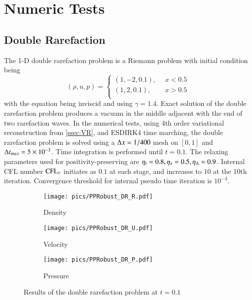 \documentclass[preprint,12pt]{elsarticle}
\begin{document}
\section{Numeric Tests}

\subsection{Double Rarefaction}

The 1-D double rarefaction problem \cite{hu2004kineticDoubleRare} 
is a Riemann problem with initial condition being
\begin{equation}
    (\rho,u,p) = \left\{
        \begin{array}{ll}
            (1,-2,0.1),\ \ & x < 0.5\\
            (1,2,0.1),\ \ & x > 0.5\\
        \end{array}
    \right.
\end{equation}
with the equation being inviscid and using $\gamma=1.4$.
Exact solution of the double rarefaction problem produces a vacuum 
in the middle adjacent with the end of two rarefaction waves.
In the numerical tests, using 4th order variational reconstruction from \ref{ssec:VR},
and ESDIRK4 time marching, 
the double rarefaction problem is solved using a $\mathrm\Delta x = 1/400$ mesh 
on $[0,1]$ and $\mathrm\Delta t_{max} = 5\times 10^{-3}$. 
Time integration is performed until $t=0.1$.
 The relaxing parameters used 
for positivity-preserving are $\eta_t= 0.8, \eta_\tau=0.5, \eta_\mathrm\Delta=0.9$.
Internal CFL number $\text{CFL}_\tau$ initiates as $0.1$ at each stage, and 
increases to $10$ at the 10th iteration. 
Convergence threshold for internal pseudo time iteration is $10^{-3}$. 

\begin{figure}[htbp]
    \centering
    \begin{subfigure}{0.33\textwidth}
        \texttt{[image: pics/PPRobust\_DR\_R.pdf]}
        \caption[]{Density}
    \end{subfigure}\hfill
    \begin{subfigure}{0.33\textwidth}
        \texttt{[image: pics/PPRobust\_DR\_U.pdf]}
        \caption[]{Velocity}
    \end{subfigure}\hfill
    \begin{subfigure}{0.33\textwidth}
        \texttt{[image: pics/PPRobust\_DR\_P.pdf]}
        \caption[]{Pressure}
    \end{subfigure}
    \caption{Results of the double rarefaction problem at $t=0.1$}
    \label{fig:doubleRare}
\end{figure}
\end{document}
